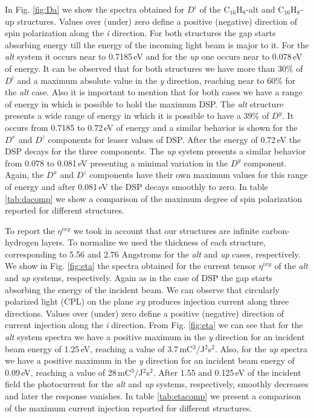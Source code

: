 \documentclass[pss]{wiley2sp} %
\begin{document}
In Fig. \ref{fig:Da} we show the spectra obtained for
{$D^{i}$} of the C$_{16}$H$_{8}$-alt and C$_{16}$H$_{8}$-up structures. Values over
(under) zero define a positive (negative) direction of spin polarization along
the \emph{i} direction. 
For both structures the gap starts absorbing energy till the energy of the incoming light beam is major to it. For the \emph{alt} system it occurs near to 0.7185\,eV and for the \emph{up} one occurs near to 0.078\,eV of energy. 
It can be observed that for both structures we have
more than 30\% of {$D^{i}$} and a maximum absolute value in the \emph{y} direction,
reaching near to 60\% for the \emph{alt} case. 
Also it is important to mention that for both cases we have a range of energy in which is possible to hold the maximum DSP. 
The \emph{alt} structure presents a wide range of energy in which it is possible to have a 39\% of $D^{y}$.  It occurs from  0.7185 to 0.72\,eV of energy and a similar behavior is shown for the  $D^{x}$ and $D^{z}$ components for leaser values of DSP. After the energy of 0.72\,eV the DSP decays for the three components. 
The \emph{up} system presents a similar behavior from 0.078 to 0.081\,eV presenting a minimal variation in the $D^{y}$ component. Again, the $D^{x}$ and $D^{z}$ components have their own maximum values for this range of energy and after 0.081\,eV the DSP decays smoothly to zero.
In table \ref{tab:dacomp}
we show a comparison of the maximum degree of spin polarization reported for
different structures.

To report the {$\eta^{ixy}$} we took in account that our structures are infinite 
carbon-hydrogen layers. To normalize we used  
the thickness of each structure, corresponding to 5.56 and 2.76 Angstroms for
the \emph{alt} and \emph{up} cases, respectively. We show in Fig. \ref{fig:eta}
the spectra obtained for the current tensor {$\eta^{ixy}$} of the
\emph{alt} and \emph{up} systems, respectively. Again as in the case of DSP the gap starts absorbing the energy of the incident beam. We can observe that
circularly polarized light (CPL) on the plane $xy$ produces injection current
along three directions. Values over (under) zero define a positive (negative)
direction of current injection along the \emph{i} direction. From Fig.
\ref{fig:eta} we can see that for the \emph{alt} system spectra 
we have a positive maximum in the \emph{y} direction for an
incident beam energy of 1.25\,eV, reaching a value of
3.7\,mC$^{3}$/J$^{2}$s$^{2}$. Also, for the \emph{up} spectra 
we have a positive maximum in the \emph{y} direction for an
incident beam energy of 0.09\,eV, reaching a value of
28\,mC$^{3}$/J$^{2}$s$^{2}$. After 1.55 and 0.125\,eV of the incident field the photocurrent for the \emph{alt} and \emph{up} systems, respectively, smoothly decreases and later the response vanishes. In table \ref{tab:etacomp} we present a comparison
of the maximum current injection reported for different structures.
\end{document}
